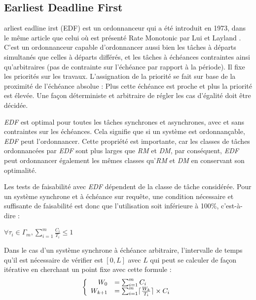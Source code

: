 	\subsection{Earliest Deadline First}\label{EDF}
	arliest eadline irst (EDF) est un ordonnanceur 
	qui a été introduit en 1973, dans le même article que celui où est présenté Rate Monotonic 
	par Lui et Layland \cite{liu_scheduling_1973}. 
	C'est un ordonnanceur capable d'ordonnancer aussi bien les tâches à départs simultanés que celles 
	à départs différés, et les tâches à échéances contraintes ainsi 
	qu'arbitraires (pas de contrainte sur l'échéance par rapport à la période). 
	Il fixe les priorités sur les travaux. L'assignation de la priorité se fait sur base de 
	la proximité de l'échéance absolue : Plus cette échéance est proche et plus la priorité est élevée. 
	Une façon déterministe et arbitraire de régler les cas d'égalité doit être décidée.\newline
	
	\textit{EDF} est optimal pour toutes les tâches synchrones et asynchrones, avec et sans 
	contraintes sur les échéances. 
	Cela signifie que si un système est ordonnançable, \textit{EDF} peut l'ordonnancer.\newline
	Cette propriété est importante, car les classes de tâches ordonnancées par \textit{EDF} 
	sont plus larges que \textit{RM} et \textit{DM}, par conséquent, \textit{EDF} peut ordonnancer également les 
	mêmes classes qu'\textit{RM} et \textit{DM} en conservant son optimalité. \newline
	
	Les tests de faisabilité avec \textit{EDF} dépendent de la classe de tâche considérée. 
	Pour un système synchrone et à échéance sur requête, 
	une condition nécessaire et suffisante de faisabilité est donc que l'utilisation soit inférieure 
	à 100\%, c'est-à-dire : 
	\begin{center}
		$\forall \tau_i \in \Gamma_m, \sum_{i=1}^{m}\frac{C_i}{T_i} \leq 1 $
	\end{center}
	
	Dans le cas d'un système synchrone à échéance arbitraire, l'intervalle de temps qu'il est 
	nécessaire de vérifier est $[0, L]$ avec $L$ qui peut se calculer de façon itérative en cherchant un point fixe 
	avec cette formule : \medskip
	\[
	\left \{
	\begin{array}{r l}
	W_0 &= \sum_{i = 1}^{m}C_i\\
	W_{k+1} & =\sum_{i = 1}^{m} \lceil \frac{W_k}{T_i} \rceil \times C_i
	\end{array}
	\right.
	\]
	
